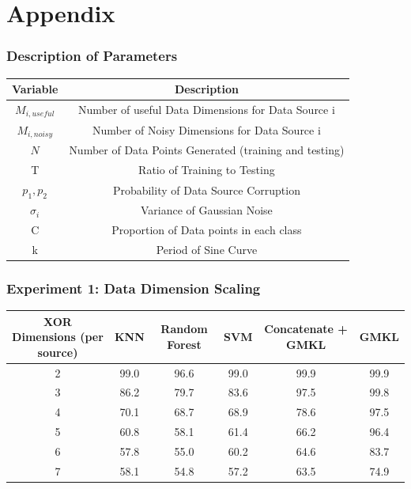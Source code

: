 \documentclass{article}
\begin{document}
\newpage
\section*{Appendix}


\begin{minipage}{\textwidth}
\centering
\subsubsection*{Description of Parameters}
\begin{tabular}{|c|c|}
\hline
\textbf{Variable} &\textbf{ Description}\\
\hline
\hline
$M_{i,useful}$ & Number of useful Data Dimensions for Data Source i\\
\hline
$M_{i, noisy}$ & Number of Noisy Dimensions for Data Source i\\
\hline
$N$ & Number of Data Points Generated (training and testing)\\
\hline
T & Ratio of Training to Testing \\
\hline
$p_1, p_2$ & Probability of Data Source Corruption\\
\hline
$\sigma_i$ & Variance of Gaussian Noise \\
\hline
C & Proportion of Data points in each class \\
\hline
k & Period of Sine Curve\\
\hline
\end{tabular}
\end{minipage}


\begin{minipage}{\textwidth}
\centering
\subsubsection*{Experiment 1: Data Dimension Scaling}
\begin{tabular}{|c| c| c| c| c| c|}
\hline
XOR Dimensions (per source) & KNN & Random Forest & SVM & Concatenate + GMKL & GMKL \\
\hline
2 & 99.0 & 96.6 & 99.0 & 99.9 & 99.9 \\
\hline
3 & 86.2 & 79.7 & 83.6 & 97.5 & 99.8 \\
\hline
4 & 70.1 & 68.7 & 68.9 & 78.6 & 97.5 \\
\hline
5 & 60.8 & 58.1 & 61.4 & 66.2 & 96.4 \\
\hline
6 & 57.8 & 55.0 & 60.2 & 64.6 & 83.7 \\
\hline
7 & 58.1 & 54.8 & 57.2 & 63.5 & 74.9 \\
\hline
\end{tabular}
\end{minipage}
\end{document}
